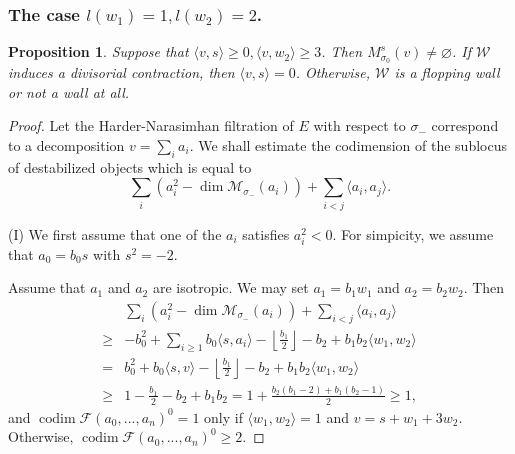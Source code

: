 \documentclass[leqno,11pt]{amsart}
\def\codim{\mathop{\mathrm{codim}}\nolimits}
\def\dim{\mathop{\mathrm{dim}}\nolimits}
\newtheorem{Prop}[Thm]{Proposition}
\theoremstyle{definition}
\def\FF{\ensuremath{\mathcal F}}
\def\MM{\ensuremath{\mathcal M}}
\def\WW{\ensuremath{\mathcal W}}
\begin{document}
\subsubsection{The case $l(w_1)=1,l(w_2)=2$.}
\begin{Prop}
Suppose that $\langle v,s\rangle\geq 0,\langle v,w_2\rangle\geq 3$.  Then $M_{\sigma_0}^s(v)\neq\varnothing$.  If $\WW$ induces a divisorial contraction, then $\langle v,s\rangle=0$.  Otherwise, $\WW$ is a flopping wall or not a wall at all.
\end{Prop}
\begin{proof}  Let the Harder-Narasimhan filtration of $E$ with respect to $\sigma_-$ correspond to a decomposition $v=\sum_i a_i$.  We shall estimate the codimension of the sublocus of destabilized objects which is equal to
 \begin{equation}
\sum_i (a_i^2-\dim \MM_{\sigma_-}(a_i))+\sum_{i<j}\langle a_i,a_j \rangle.
\end{equation}


(I) We first assume that one of the $a_i$ satisfies $a_i^2<0$.
For simpicity, we assume that $a_0=b_0 s$ with $s^2=-2$.

Assume that $a_1$ and $a_2$ are isotropic.
We may set $a_1=b_1 w_1$ and $a_2=b_2 w_2$.
Then 
 \begin{equation}\label{eq: spherical 1,2 case I}
\begin{split}
& \sum_i (a_i^2-\dim \MM_{\sigma_-}(a_i))+\sum_{i<j}\langle a_i,a_j \rangle\\
\geq & -b_0^2+\sum_{i \geq 1}b_0 \langle s,a_i \rangle
-\left\lfloor\frac{b_1}{2}\right\rfloor-b_2+b_1 b_2 \langle w_1,w_2 \rangle\\
= & b_0^2+b_0 \langle s,v \rangle-\left\lfloor\frac{b_1}{2}\right\rfloor-b_2+b_1 b_2 \langle w_1,w_2 \rangle\\
\geq & 1-\frac{b_1}{2}-b_2+b_1 b_2=1+\frac{b_2(b_1-2)+b_1(b_ 2-1)}{2} \geq 1,
\end{split}
\end{equation} 
 and $\codim\FF(a_0,...,a_n)^0=1$ only if $\langle w_1,w_2\rangle=1$ and $v=s+w_1+3w_2$.  Otherwise, $\codim\FF(a_0,...,a_n)^0\geq 2$.
 


\end{proof}
\end{document}
